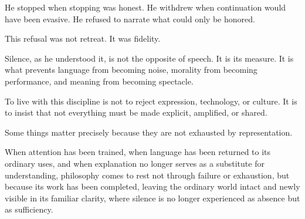 \documentclass[11pt]{article}
\begin{document}
He stopped when stopping was honest.  
He withdrew when continuation would have been evasive.  
He refused to narrate what could only be honored.  

This refusal was not retreat. It was fidelity.

Silence, as he understood it, is not the opposite of speech. It is its measure. It is what prevents language from becoming noise, morality from becoming performance, and meaning from becoming spectacle.

To live with this discipline is not to reject expression, technology, or culture. It is to insist that not everything must be made explicit, amplified, or shared.

Some things matter precisely because they are not exhausted by representation.

When attention has been trained, when language has been returned to its ordinary uses, and when explanation no longer serves as a substitute for understanding, philosophy comes to rest not through failure or exhaustion, but because its work has been completed, leaving the ordinary world intact and newly visible in its familiar clarity, where silence is no longer experienced as absence but as sufficiency.
\end{document}
